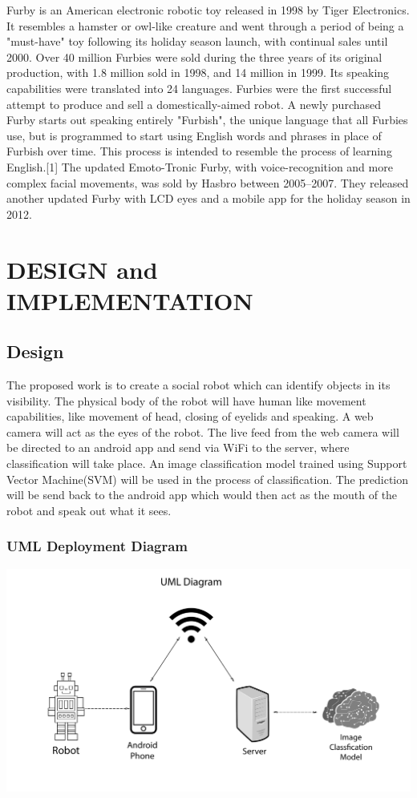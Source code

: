\documentclass{fisatproject}
\begin{document}
Furby is an American electronic robotic toy released in 1998 by Tiger Electronics. It resembles a hamster or owl-like creature and went through a period of being a "must-have" toy following its holiday season launch, with continual sales until 2000. Over 40 million Furbies were sold during the three years of its original production, with 1.8 million sold in 1998, and 14 million in 1999. Its speaking capabilities were translated into 24 languages.\newline\newline
Furbies were the first successful attempt to produce and sell a domestically-aimed robot. A newly purchased Furby starts out speaking entirely "Furbish", the unique language that all Furbies use, but is programmed to start using English words and phrases in place of Furbish over time. This process is intended to resemble the process of learning English.[1] The updated Emoto-Tronic Furby, with voice-recognition and more complex facial movements, was sold by Hasbro between 2005–2007. They released another updated Furby with LCD eyes and a mobile app for the holiday season in 2012.\cite{e}



\chapter{DESIGN and IMPLEMENTATION}

\section{Design}
The proposed work is to create a social robot which can identify objects in its visibility. The physical body of the robot will have human like movement capabilities, like movement of head, closing of eyelids and speaking. A web camera will act as the eyes of the robot. The live feed from the web camera will be directed to an android app and send via WiFi to the server, where classification will take place. An image classification model trained using Support Vector Machine(SVM) will be used in the process of classification. The prediction will be send back to the android app which would then act as the mouth of the robot and speak out what it sees.
\subsection{UML Deployment Diagram}
\includegraphics[scale=0.40]{uml_dia.jpg}
\end{document}
